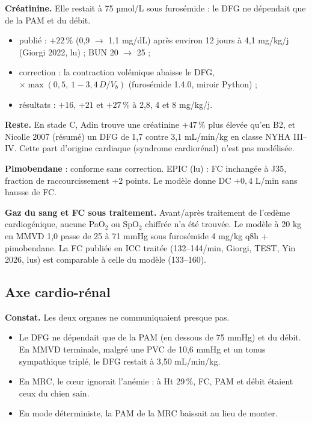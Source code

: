 \documentclass[10pt,a4paper]{article}
\newcommand{\vp}[1]{\path{#1}}
\begin{document}
\textbf{Créatinine.} Elle restait à 75 µmol/L sous furosémide : le DFG ne dépendait que de la PAM et du débit.
\begin{itemize}
\item publié : $+22$\,\% (0,9 $\to$ 1,1 mg/dL) après environ 12 jours à 4,1 mg/kg/j (Giorgi 2022, lu) ; BUN 20 $\to$ 25 ;
\item correction : la contraction volémique abaisse le DFG, \vp{nephron_mass} $\times\max(0{,}5,\ 1 - 3{,}4\,D/V_b)$ (furosémide 1.4.0, miroir Python) ;
\item résultats : $+16$, $+21$ et $+27$\,\% à 2,8, 4 et 8 mg/kg/j.
\end{itemize}

\textbf{Reste.} En stade C, Adin trouve une créatinine $+47$\,\% plus élevée qu'en B2, et Nicolle 2007 (résumé) un DFG de 1,7 contre 3,1 mL/min/kg en classe NYHA III–IV. Cette part d'origine cardiaque (syndrome cardiorénal) n'est pas modélisée.

\textbf{Pimobendane} : conforme sans correction. EPIC (lu) : FC inchangée à J35, fraction de raccourcissement $+2$ points. Le modèle donne DC $+0{,}4$ L/min sans hausse de FC.

\textbf{Gaz du sang et FC sous traitement.} Avant/après traitement de l'œdème cardiogénique, aucune PaO$_2$ ou SpO$_2$ chiffrée n'a été trouvée. Le modèle à 20 kg en MMVD 1,0 passe de 25 à 71 mmHg sous furosémide 4 mg/kg q8h + pimobendane. La FC publiée en ICC traitée (132–144/min, Giorgi, TEST, Yin 2026, lus) est comparable à celle du modèle (133–160).

\subsection{Axe cardio-rénal}
\textbf{Constat.} Les deux organes ne communiquaient presque pas.
\begin{itemize}
\item Le DFG ne dépendait que de la PAM (en dessous de 75 mmHg) et du débit. En MMVD terminale, malgré une PVC de 10,6 mmHg et un tonus sympathique triplé, le DFG restait à 3,50 mL/min/kg.
\item En MRC, le cœur ignorait l'anémie : à Ht 29\,\%, FC, PAM et débit étaient ceux du chien sain.
\item En mode déterministe, la PAM de la MRC baissait au lieu de monter.
\end{itemize}
\end{document}

